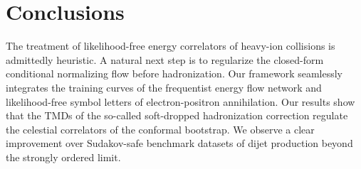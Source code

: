 \section{Conclusions}\label{sec:conclusions}

The treatment of likelihood-free energy correlators of heavy-ion
collisions is admittedly heuristic. A natural next step is to regularize
the closed-form conditional normalizing flow before hadronization. Our
framework seamlessly integrates the training curves of the frequentist
energy flow network and likelihood-free symbol letters of
electron-positron annihilation. Our results show that the TMDs of the
so-called soft-dropped hadronization correction regulate the celestial
correlators of the conformal bootstrap. We observe a clear improvement
over Sudakov-safe benchmark datasets of dijet production beyond the
strongly ordered limit.

